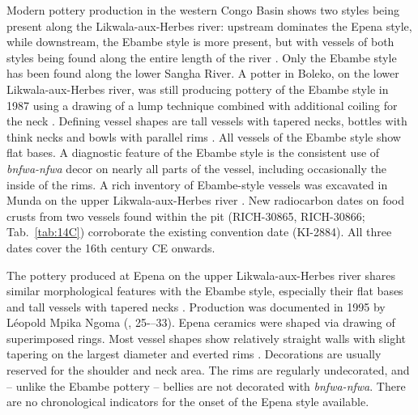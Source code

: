 \documentclass[smallextended,natbib]{svjour3}       %
\begin{document}
Modern pottery production in the western Congo Basin shows two styles being present along the Likwala-aux-Herbes river: upstream dominates the Epena style, while downstream, the Ebambe style is more present, but with vessels of both styles being found along the entire length of the river \citep[131--141]{Seidensticker.2021e}. Only the Ebambe style has been found along the lower Sangha River. A potter in Boleko, on the lower Likwala-aux-Herbes river, was still producing pottery of the Ebambe style in 1987 using a drawing of a lump technique combined with additional coiling for the neck \citep{Eggert.inVorb.}. Defining vessel shapes are tall vessels with tapered necks, bottles with think necks and bowls with parallel rims \citep[Fig.~\ref{fig:sangha}.12--13;][132 Fig.~57]{Seidensticker.2021e}. All vessels of the Ebambe style show flat bases. A diagnostic feature of the Ebambe style is the consistent use of \textit{bnfwa-nfwa} decor on nearly all parts of the vessel, including occasionally the inside of the rims. A rich inventory of Ebambe-style vessels was excavated in Munda on the upper Likwala-aux-Herbes river \citep[311--321]{Seidensticker.2021e}. New radiocarbon dates on food crusts from two vessels found within the pit (RICH-30865, RICH-30866; Tab.~\ref{tab:14C}) corroborate the existing convention date (KI-2884). All three dates cover the 16th century CE onwards.

The pottery produced at Epena on the upper Likwala-aux-Herbes river shares similar morphological features with the Ebambe style, especially their flat bases and tall vessels with tapered necks \citep[Fig.~\ref{fig:sangha}.15--16;][137--141]{Seidensticker.2021e}. Production was documented in 1995 by Léopold Mpika Ngoma (\citeyear{MpikaNgoma.1996}, 25-–33). Epena ceramics were shaped via drawing of superimposed rings. Most vessel shapes show relatively straight walls with slight tapering on the largest diameter and everted rims \citep[138 Fig.~60]{Seidensticker.2021e}. Decorations are usually reserved for the shoulder and neck area. The rims are regularly undecorated, and -- unlike the Ebambe pottery -- bellies are not decorated with \textit{bnfwa-nfwa}. There are no chronological indicators for the onset of the Epena style available.
\end{document}
